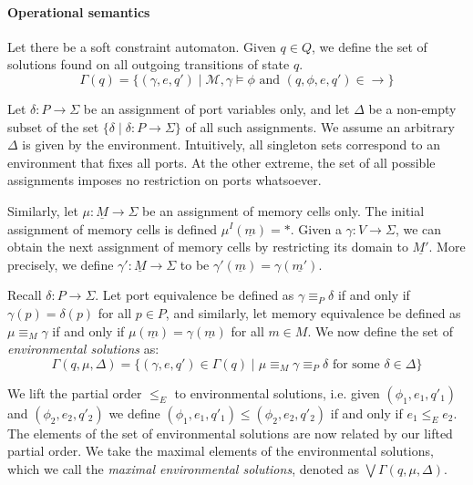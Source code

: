 \paragraph{Operational semantics}
Let there be a soft constraint automaton. Given $q\in Q$, we define the set of solutions found on all outgoing transitions of state $q$.
$$\Gamma(q) = \{(\gamma,e,q')\mid \mathcal{M},\gamma\models\phi\text{ and }(q,\phi,e,q') \in{\rightarrow}\}$$

Let $\delta:P\to\Sigma$ be an assignment of port variables only,
and let $\Delta$ be a non-empty subset of the set $\{\delta\mid\delta:P\to\Sigma\}$ of all such assignments. We assume an arbitrary $\Delta$ is given by the environment. Intuitively, all singleton sets correspond to an environment that fixes all ports. At the other extreme, the set of all possible assignments imposes no restriction on ports whatsoever.


Similarly, let $\mu:\underline{M}\to\Sigma$ be an assignment of memory cells only. The initial assignment of memory cells is defined $\mu^I(\underline{m})=*$. Given a $\gamma:V\to\Sigma$, we can obtain the next assignment of memory cells by restricting its domain to $\underline{M'}$. More precisely, we define $\gamma':\underline{M}\to\Sigma$ to be $\gamma'(\underline{m})=\gamma(\underline{m'})$.

Recall $\delta:P\to\Sigma$. Let port equivalence be defined as $\gamma\equiv_P\delta$ if and only if $\gamma(p)=\delta(p)$ for all $p\in P$, and similarly, let memory equivalence be defined as $\mu\equiv_M\gamma$ if and only if $\mu(\underline{m})=\gamma(\underline{m})$ for all $m\in M$. We now define the set of \emph{environmental solutions} as:
$$\Gamma(q,\mu,\Delta) = \{(\gamma, e, q')\in\Gamma(q) \mid \mu\equiv_M\gamma\equiv_P\delta\text{ for some }\delta\in\Delta\}$$

We lift the partial order $\leq_E$ to environmental solutions, i.e. given $(\phi_1,e_1,q'_1)$ and $(\phi_2,e_2,q'_2)$ we define $(\phi_1,e_1,q'_1)\leq(\phi_2,e_2,q'_2)$ if and only if $e_1 \leq_E e_2$. The elements of the set of environmental solutions are now related by our lifted partial order. We take the maximal elements of the environmental solutions, which we call the \emph{maximal environmental solutions}, denoted as $\bigvee\!\Gamma(q,\mu,\Delta)$.

